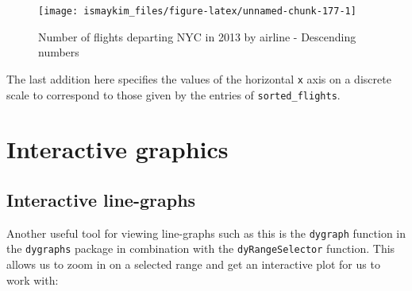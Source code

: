 \documentclass[]{tufte-book}
\newenvironment{Shaded}{\begin{snugshade}}{\end{snugshade}}
\newcommand{\KeywordTok}[1]{\textcolor[rgb]{0.13,0.29,0.53}{\textbf{{#1}}}}
\newcommand{\DataTypeTok}[1]{\textcolor[rgb]{0.13,0.29,0.53}{{#1}}}
\newcommand{\StringTok}[1]{\textcolor[rgb]{0.31,0.60,0.02}{{#1}}}
\newcommand{\OtherTok}[1]{\textcolor[rgb]{0.56,0.35,0.01}{{#1}}}
\newcommand{\NormalTok}[1]{{#1}}
\theoremstyle{definition}
\theoremstyle{definition}
\theoremstyle{remark}
\begin{document}
\begin{figure}

{\centering \texttt{[image: ismaykim\_files/figure-latex/unnamed-chunk-177-1]} 

}

\caption[Number of flights departing NYC in 2013 by airline - Descending numbers]{Number of flights departing NYC in 2013 by airline - Descending numbers}\label{fig:unnamed-chunk-177}
\end{figure}

The last addition here specifies the values of the horizontal \texttt{x}
axis on a discrete scale to correspond to those given by the entries of
\texttt{sorted\_flights}.

\section{Interactive graphics}\label{interactive-graphics}

\subsection{Interactive line-graphs}\label{interactive-line-graphs}

Another useful tool for viewing line-graphs such as this is the
\texttt{dygraph} function in the \texttt{dygraphs} package in
combination with the \texttt{dyRangeSelector} function. This allows us
to zoom in on a selected range and get an interactive plot for us to
work with:

\begin{Shaded}
\end{Shaded}
\end{document}
